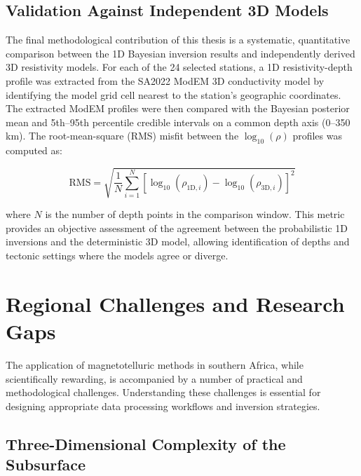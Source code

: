 \subsection*{Validation Against Independent 3D Models}

The final methodological contribution of this thesis is a systematic, quantitative comparison between the 1D Bayesian inversion results and independently derived 3D resistivity models. For each of the 24 selected stations, a 1D resistivity-depth profile was extracted from the SA2022 ModEM 3D conductivity model by identifying the model grid cell nearest to the station's geographic coordinates. The extracted ModEM profiles were then compared with the Bayesian posterior mean and 5th--95th percentile credible intervals on a common depth axis (0--350 km). The root-mean-square (RMS) misfit between the $\log_{10}(\rho)$ profiles was computed as:

\begin{equation}
\text{RMS} = \sqrt{\frac{1}{N} \sum_{i=1}^{N} \left[\log_{10}(\rho_{\text{1D},i}) - \log_{10}(\rho_{\text{3D},i})\right]^2}
\end{equation}

\noindent where $N$ is the number of depth points in the comparison window. This metric provides an objective assessment of the agreement between the probabilistic 1D inversions and the deterministic 3D model, allowing identification of depths and tectonic settings where the models agree or diverge.


\section*{Regional Challenges and Research Gaps}

The application of magnetotelluric methods in southern Africa, while scientifically rewarding, is accompanied by a number of practical and methodological challenges. Understanding these challenges is essential for designing appropriate data processing workflows and inversion strategies.

\subsection*{Three-Dimensional Complexity of the Subsurface}

